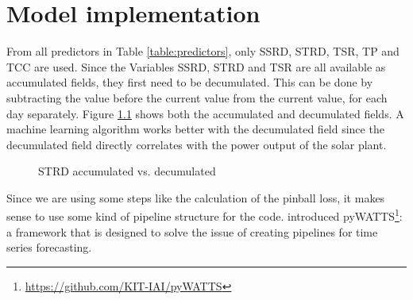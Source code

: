 \chapter{Model implementation}
\label{ch:model-implementation}

From all predictors in Table \ref{table:predictors}, only SSRD, STRD, TSR, TP and TCC are used. 
Since the Variables SSRD, STRD and TSR are all available as accumulated fields, they first need to be decumulated.
This can be done by subtracting the value before the current value from the current value, for each day separately. 
Figure \ref{fig:strd-accumulated-vs-decumulated} shows both the accumulated and decumulated fields. 
A machine learning algorithm works better with the decumulated field since the decumulated field directly correlates 
with the power output of the solar plant.

\begin{figure}[h]%
    \centering
    \qquad
    \caption{STRD accumulated vs. decumulated}%
    \label{fig:strd-accumulated-vs-decumulated}%
\end{figure}

Since we are using some steps like the calculation of the pinball loss, 
it makes sense to use some kind of pipeline structure for the code. 
\Textcite{Heidrich2021} introduced 
pyWATTS\footnote{\url{https://github.com/KIT-IAI/pyWATTS}}: a framework 
that is designed to solve the issue of creating pipelines for time series 
forecasting. 





